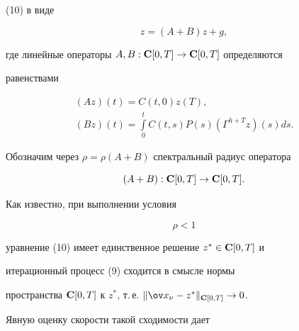 (10) в виде


\begin{equation}


z=(A+B)z+g,


\end{equation}


где линейные операторы $A,B:{\bold C}[0,T]\to {\bold C}[0,T]$ определяются


равенствами


\begin{gather*}


(Az)(t)=C(t,0)z(T), \\


%


(Bz)(t)=\int\limits_0^tC(t,s)P(s)({\Gamma}^{h+T}z)(s)ds.


\end{gather*}





Обозначим через ${\rho}={\rho}(A+B)$ спектральный радиус оператора


$$


(A+B):{\spc C}[0,T]\to {\spc C}[0,T].


$$


Как известно, при выполнении условия


\begin{equation}


{\rho}<1


\end{equation}


уравнение (10) имеет единственное решение $z^*\in {\bold C}[0,T]$ и


итерационный процесс (9) сходится в смысле нормы


пространства ${\spc C}[0,T]$ к $z^*$, т.\,е. $\|{\ov


x_{\nu}}-z^* \|_{\bold C[0,T]}\to 0$.





Явную оценку скорости такой сходимости дает





